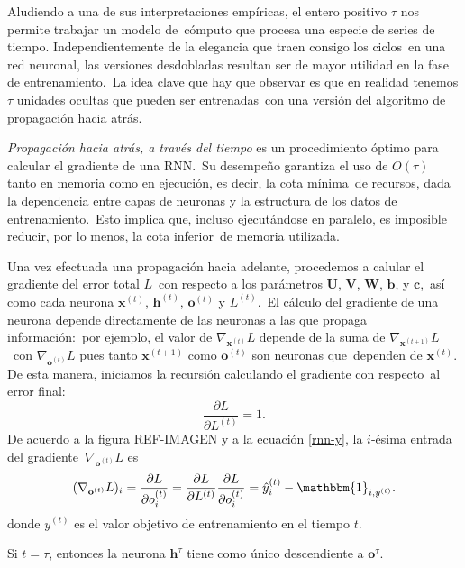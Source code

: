 \noindent
Aludiendo a una de sus interpretaciones empíricas, el entero positivo $\tau$ nos permite trabajar un modelo de\
cómputo que procesa una especie de series de tiempo. Independientemente de la elegancia que traen consigo los ciclos\
en una red neuronal, las versiones desdobladas resultan ser de mayor utilidad en la fase de entrenamiento.\
La idea clave que hay que observar es que en realidad tenemos $\tau$ unidades ocultas que pueden ser entrenadas\
con una versión del algoritmo de propagación hacia atrás.\par
\emph{Propagación hacia atrás, a través del tiempo} es un procedimiento óptimo para calcular el gradiente de una RNN.\
Su desempeño garantiza el uso de $O(\tau)$ tanto en memoria como en ejecución, es decir, la cota mínima\
de recursos, dada la dependencia entre capas de neuronas y la estructura de los datos de entrenamiento.\
Esto implica que, incluso ejecutándose en paralelo, es imposible reducir, por lo menos, la cota inferior\
de memoria utilizada.\par
Una vez efectuada una propagación hacia adelante, procedemos a calular el gradiente del error total $L$\
con respecto a los parámetros $\mathbf{U}$, $\mathbf{V}$, $\mathbf{W}$, $\mathbf{b}$, y $\mathbf{c}$,\
así como cada neurona $\mathbf{x}^{(t)}$, $\mathbf{h}^{(t)}$, $\mathbf{o}^{(t)}$ y $L^{(t)}$.\
El cálculo del gradiente de una neurona depende directamente de las neuronas a las que propaga información:\
por ejemplo, el valor de $\nabla_{\mathbf{x}^{(t)}}L$ depende de la suma de $\nabla_{\mathbf{x}^{(t+1)}}L$\
con $\nabla_{\mathbf{o}^{(t)}}L$ pues tanto $\mathbf{x}^{(t+1)}$ como $\mathbf{o}^{(t)}$ son neuronas que\
dependen de $\mathbf{x}^{(t)}$. De esta manera, iniciamos la recursión calculando el gradiente con respecto\
al error final:
\begin{equation}
  \frac{\partial L}{\partial L^{(t)}} = 1.
\end{equation}
De acuerdo a la figura REF-IMAGEN y a la ecuación \ref{rnn-y}, la $i$-ésima entrada del gradiente\
$\nabla_{\mathbf{o}^{(t)}}L$ es
\begin{equation}
  (\nabla_{\mathbf{o}^{(t)}}L)_i = \frac{\partial L}{\partial o_i^{(t)}} =
  \frac{\partial L}{\partial L^{(t)}} \frac{\partial L}{\partial o_i^{(t)}} =
  \hat{y}_i^{(t)} - \mathbbm{1}_{i, y^{(t)}}.
\end{equation}
donde $y^{(t)}$ es el valor objetivo de entrenamiento en el tiempo $t$.\par
Si $t = \tau$, entonces la neurona $\mathbf{h}^{\tau}$ tiene como único descendiente a $\mathbf{o}^{\tau}$.\
